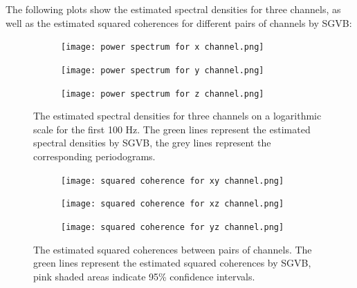 \documentclass[12pt,a4paper]{article}
\begin{document}
The following plots show the estimated spectral densities for three channels, as well as the estimated squared coherences for different pairs of channels by SGVB:
\begin{figure}[H]
\centering
\begin{subfigure}{\textwidth} %
  \centering
  \texttt{[image: power spectrum for x channel.png]}
\end{subfigure}

\begin{subfigure}{\textwidth} %
  \centering
  \texttt{[image: power spectrum for y channel.png]}
\end{subfigure}

\begin{subfigure}{\textwidth} %
  \centering
  \texttt{[image: power spectrum for z channel.png]}
\end{subfigure}

\caption{The estimated spectral densities for three channels on a logarithmic scale for the first 100 Hz. The green lines represent the estimated spectral densities by SGVB, the grey lines represent the corresponding periodograms.}
\label{psd channels}
\end{figure}

\begin{figure}[H]
\centering
\begin{subfigure}{\textwidth} %
  \centering
  \texttt{[image: squared coherence for xy channel.png]}
\end{subfigure}

\begin{subfigure}{\textwidth} %
  \centering
  \texttt{[image: squared coherence for xz channel.png]}
\end{subfigure}

\begin{subfigure}{\textwidth} %
  \centering
  \texttt{[image: squared coherence for yz channel.png]}
\end{subfigure}
\caption{The estimated squared coherences between pairs of channels. The green lines represent the estimated squared coherences by SGVB, pink shaded areas indicate 95\% confidence intervals.}
\label{coh channels}
\end{figure}
\end{document}
